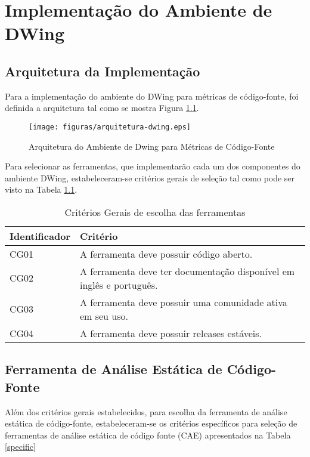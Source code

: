 \chapter{Implementação do Ambiente de DWing}
\label{estudo de caso}

\section{Arquitetura da Implementação}

Para a implementação do ambiente do DWing para métricas de código-fonte, foi definida a arquitetura tal como se mostra Figura \ref{arquitetura}.


\begin{figure}[ht!]
\centering
\texttt{[image: figuras/arquitetura-dwing.eps]}
\caption{Arquitetura do Ambiente de Dwing para Métricas de Código-Fonte}
\label{arquitetura}
\end{figure}
\FloatBarrier

Para selecionar as ferramentas, que implementarão cada um dos componentes do ambiente DWing, estabeleceram-se critérios gerais de seleção tal como pode ser visto na Tabela \ref{seleção}.


	\begin{table}[!ht]
	\begin{center}
	 \begin{tabular}{|l|l|}
		\hline
		Identificador & Critério 
		\\ \hline
		CG01 & A ferramenta deve possuir código aberto.  
		\\ \hline
		CG02 & A ferramenta deve ter documentação disponível em inglês e português.      
		\\ \hline
		CG03 & A ferramenta deve possuir uma comunidade ativa em seu uso.
		\\ \hline
		CG04 & A ferramenta deve possuir releases estáveis.    
		\\ \hline
		\end{tabular}
		\caption{Critérios Gerais de escolha das ferramentas}
		\label{seleção}
		\end{center}
		\end{table}	


\section{Ferramenta de Análise Estática de Código-Fonte}

Além dos critérios gerais estabelecidos, para escolha da ferramenta de análise estática de código-fonte, estabeleceram-se os critérios específicos para seleção de ferramentas de análise estática de código fonte (CAE) apresentados na Tabela \ref{specific}


